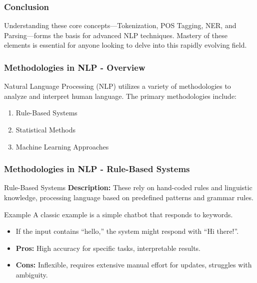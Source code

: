 \documentclass[aspectratio=169]{beamer}
\begin{document}
\begin{frame}
    \frametitle{Conclusion}
    Understanding these core concepts—Tokenization, POS Tagging, NER, and Parsing—forms the basis for advanced NLP techniques. Mastery of these elements is essential for anyone looking to delve into this rapidly evolving field.
\end{frame}

\begin{frame}[fragile]
    \frametitle{Methodologies in NLP - Overview}
    Natural Language Processing (NLP) utilizes a variety of methodologies to analyze and interpret human language. The primary methodologies include:
    \begin{enumerate}
        \item Rule-Based Systems
        \item Statistical Methods
        \item Machine Learning Approaches
    \end{enumerate}
\end{frame}

\begin{frame}[fragile]
    \frametitle{Methodologies in NLP - Rule-Based Systems}
    \begin{block}{Rule-Based Systems}
        \textbf{Description:} These rely on hand-coded rules and linguistic knowledge, processing language based on predefined patterns and grammar rules.
    \end{block}
    \begin{exampleblock}{Example}
        A classic example is a simple chatbot that responds to keywords. 
        \begin{itemize}
            \item If the input contains “hello,” the system might respond with “Hi there!”.
        \end{itemize}
    \end{exampleblock}
    \begin{itemize}
        \item \textbf{Pros:} High accuracy for specific tasks, interpretable results.
        \item \textbf{Cons:} Inflexible, requires extensive manual effort for updates, struggles with ambiguity.
    \end{itemize}
\end{frame}
\end{document}
